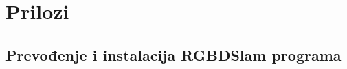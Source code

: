 \newpage

\section*{Prilozi} %
\label{sec:Prilozi}

\subsection*{Prevođenje i instalacija RGBDSlam programa} %
\label{sub:RGBDSlam prilog}


